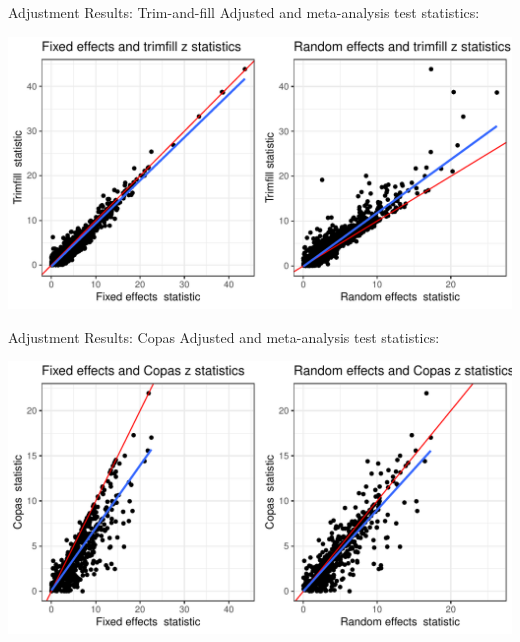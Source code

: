 \documentclass[english]{beamer}\usepackage[]{graphicx}\usepackage[]{color}
\makeatletter
\def\maxwidth{ %
  \ifdim\Gin@nat@width>\linewidth
    \linewidth
  \else
    \Gin@nat@width
  \fi
}
\newenvironment{knitrout}{}{} %
\makeatother
\begin{document}
\begin{frame}[fragile]{Adjustment Results: Trim-and-fill}
Adjusted and meta-analysis test statistics:

\vspace{-3mm} 
\begin{knitrout}
\color{fgcolor}
\includegraphics[width=\maxwidth]{figure/unnamed-chunk-16-1} 

\end{knitrout}
\end{frame}


\begin{frame}[fragile]{Adjustment Results: Copas}
Adjusted and meta-analysis test statistics:

\vspace{-3mm}
\begin{knitrout}
\color{fgcolor}
\includegraphics[width=\maxwidth]{figure/unnamed-chunk-17-1} 

\end{knitrout}
\end{frame}
\end{document}
